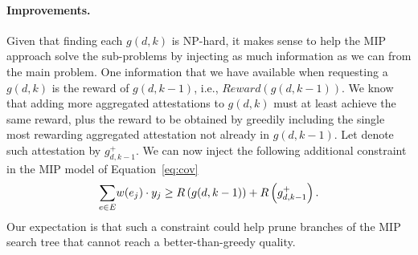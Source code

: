 \documentclass{article}
\begin{document}
\paragraph{Improvements.} Given that finding each $g(d, k)$ is NP-hard, it
makes sense to help the MIP approach solve the sub-problems by injecting as
much information as we can from the main problem. One information that we have
available when requesting a $g(d, k)$ is the reward of $g(d, k-1)$, i.e.,
$Reward(g(d, k-1))$. We know that adding more aggregated attestations
to $g(d, k)$ must at least achieve the same reward, plus the reward to be
obtained by greedily including the single most rewarding aggregated
attestation not already in $g(d, k-1)$. Let denote such attestation by $g^{+}_{d,
k-1}$. We can now inject the following additional constraint in the MIP model
of Equation~\ref{eq:cov}
%
\begin{equation}
  \underset{e \in E}{\sum}w(e_j) \cdot y_j \geq R\left(g(d,k-1)\right) + R\left(
  g^{+}_{d,k-1}\right).  
\end{equation}
%
Our expectation is that such a constraint could help prune branches of
the MIP search tree that cannot reach a better-than-greedy quality.




\end{document}
